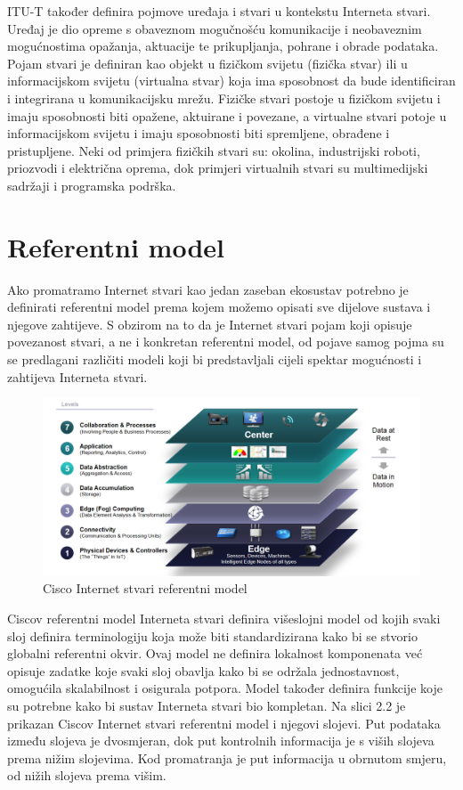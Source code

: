 \documentclass[times, utf8, diplomski]{fer}
\begin{document}
ITU-T također definira pojmove uređaja i stvari u kontekstu Interneta stvari. Uređaj je dio opreme s obaveznom mogučnošću komunikacije i neobaveznim mogućnostima opažanja, aktuacije te prikupljanja, pohrane i obrade podataka. Pojam stvari je definiran kao objekt u fizičkom svijetu (fizička stvar) ili u informacijskom svijetu (virtualna stvar) koja ima sposobnost da bude identificiran i integrirana u komunikacijsku mrežu. Fizičke stvari postoje u fizičkom svijetu i imaju sposobnosti biti opažene, aktuirane i povezane, a virtualne stvari potoje u informacijskom svijetu i imaju sposobnosti biti spremljene, obrađene i pristupljene. Neki od primjera fizičkih stvari su: okolina, industrijski roboti, priozvodi i električna oprema, dok primjeri virtualnih stvari su multimedijski sadržaji i programska podrška.

\section{Referentni model}
Ako promatramo Internet stvari kao jedan zaseban ekosustav potrebno je definirati referentni model prema kojem možemo opisati sve dijelove sustava i njegove zahtijeve. S obzirom na to da je Internet stvari pojam koji opisuje povezanost stvari, a ne i konkretan referentni model, od pojave samog pojma su se predlagani različiti modeli koji bi predstavljali cijeli spektar mogućnosti i zahtijeva Interneta stvari. 
\begin{figure}[htb]
    \centering
    \includegraphics[width=14cm]{images/ciscomodel.png}
    \caption{Cisco Internet stvari referentni model\citep{CiscoIotModel}}
    \label{fig:ciscomodel}
\end{figure}

Ciscov referentni model Interneta stvari\citep{CiscoIotModel} definira višeslojni model od kojih svaki sloj definira terminologiju koja može biti standardizirana kako bi se stvorio globalni referentni okvir. Ovaj model ne definira lokalnost komponenata već opisuje zadatke koje svaki sloj obavlja kako bi se održala jednostavnost, omogućila skalabilnost i osigurala potpora. Model također definira funkcije koje su potrebne kako bi sustav Interneta stvari bio kompletan. Na slici 2.2 je prikazan Ciscov Internet stvari referentni model i njegovi slojevi. Put podataka između slojeva je dvosmjeran, dok put kontrolnih informacija je s viših slojeva prema nižim slojevima. Kod promatranja je put informacija u obrnutom smjeru, od nižih slojeva prema višim. 
\end{document}
